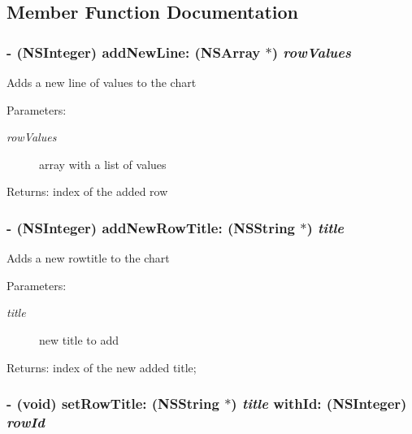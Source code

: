 \subsection{Member Function Documentation}
\hypertarget{interface_t_p_chart_basic_a41306abeba81e4799c5b45eff1fefea}{
\subsubsection[{addNewLine:}]{\setlength{\rightskip}{0pt plus 5cm}- (NSInteger) addNewLine: (NSArray $\ast$) {\em rowValues}}}
\label{interface_t_p_chart_basic_a41306abeba81e4799c5b45eff1fefea}


Adds a new line of values to the chart \begin{Desc}
\item[Parameters:]
\begin{description}
\item[{\em rowValues}]array with a list of values \end{description}
\end{Desc}
\begin{Desc}
\item[Returns:]index of the added row \end{Desc}
\hypertarget{interface_t_p_chart_basic_dbaf4e508385b4d2b56ff1c5b26fa518}{
\subsubsection[{addNewRowTitle:}]{\setlength{\rightskip}{0pt plus 5cm}- (NSInteger) addNewRowTitle: (NSString $\ast$) {\em title}}}
\label{interface_t_p_chart_basic_dbaf4e508385b4d2b56ff1c5b26fa518}


Adds a new rowtitle to the chart \begin{Desc}
\item[Parameters:]
\begin{description}
\item[{\em title}]new title to add \end{description}
\end{Desc}
\begin{Desc}
\item[Returns:]index of the new added title; \end{Desc}
\hypertarget{interface_t_p_chart_basic_ac52ed925271b579ff3ec12835ed4179}{
\subsubsection[{setRowTitle:withId:}]{\setlength{\rightskip}{0pt plus 5cm}- (void) setRowTitle: (NSString $\ast$) {\em title}\/ withId: (NSInteger) {\em rowId}}}
\label{interface_t_p_chart_basic_ac52ed925271b579ff3ec12835ed4179}


